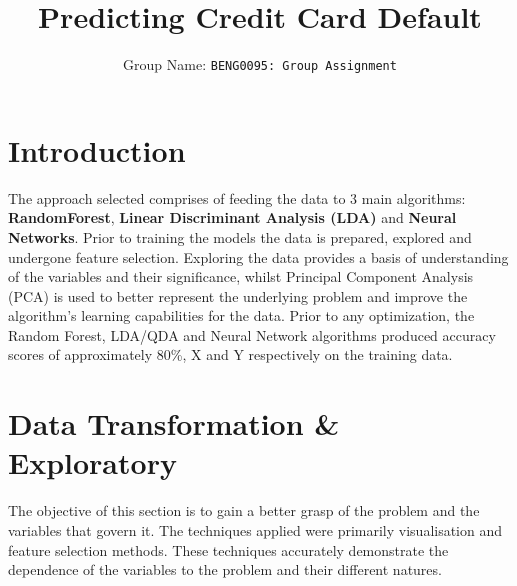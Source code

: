 \documentclass{article}
\title{Predicting Credit Card Default}
\author{
 Group Name: \texttt{BENG0095: Group Assignment}\\
}
\begin{document}
\maketitle

\section{Introduction}
The approach selected comprises of feeding the data to 3 main algorithms: \textbf{RandomForest}, \textbf{Linear Discriminant Analysis (LDA)} and \textbf{Neural Networks}. Prior to training the models the data is prepared, explored and undergone feature selection. Exploring the data provides a basis of understanding  of the variables and their significance, whilst Principal Component Analysis (PCA) is used to better represent the underlying problem and improve the algorithm’s learning capabilities for the data. Prior to any optimization, the Random Forest, LDA/QDA and Neural Network algorithms produced accuracy scores of approximately 80\%, X and Y respectively on the training data.

\section{Data Transformation \& Exploratory}
The objective of this section is to gain a better grasp of the problem and the variables that govern it. The techniques applied were primarily visualisation and feature selection methods. These techniques accurately demonstrate the dependence of the variables to the problem and their different natures.
\end{document}
